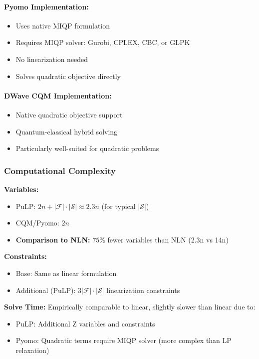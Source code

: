 \documentclass[11pt,a4paper]{article}
\begin{document}
\paragraph{Pyomo Implementation:}

\begin{itemize}
    \item Uses native MIQP formulation
    \item Requires MIQP solver: Gurobi, CPLEX, CBC, or GLPK
    \item No linearization needed
    \item Solves quadratic objective directly
\end{itemize}

\paragraph{DWave CQM Implementation:}
\begin{itemize}
    \item Native quadratic objective support
    \item Quantum-classical hybrid solving
    \item Particularly well-suited for quadratic problems
\end{itemize}

\subsubsection{Computational Complexity}

\textbf{Variables:}
\begin{itemize}
    \item PuLP: $2n + |\mathcal{F}| \cdot |\mathcal{S}| \approx 2.3n$ (for typical $|\mathcal{S}|$)
    \item CQM/Pyomo: $2n$
    \item \textbf{Comparison to NLN:} $75\%$ fewer variables than NLN (2.3n vs 14n)
\end{itemize}

\textbf{Constraints:}
\begin{itemize}
    \item Base: Same as linear formulation
    \item Additional (PuLP): $3|\mathcal{F}| \cdot |\mathcal{S}|$ linearization constraints
\end{itemize}

\textbf{Solve Time:} Empirically comparable to linear, slightly slower than linear due to:
\begin{itemize}
    \item PuLP: Additional Z variables and constraints
    \item Pyomo: Quadratic terms require MIQP solver (more complex than LP relaxation)
\end{itemize}
\end{document}
